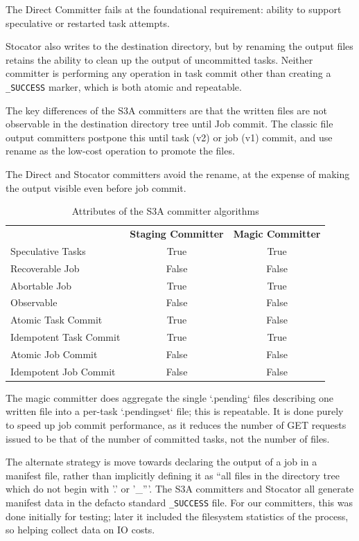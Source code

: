 \documentclass[conference]{IEEEtran}
\begin{document}
The Direct Committer fails at the foundational requirement: ability to support
speculative or restarted task attempts.

Stocator also writes to the destination directory, but by renaming the output
files retains the ability to clean up the output of uncommitted tasks.
Neither committer is performing any operation in task commit other than creating
a \texttt{\_SUCCESS} marker, which is both atomic and repeatable.


The key differences of the S3A committers are that the written files are
not observable in the destination directory tree until Job commit.
The classic file output committers postpone this until task (v2) or job (v1)
commit, and use rename as the low-cost operation to promote the files.


The Direct and Stocator committers avoid the rename, at the expense of making
the output visible even before job commit.

\begin{table}
  \label{tab:s3a-committer-attributes}
  \begin{tabular}{ l c c }
    \hline
    & \textbf{Staging Committer} & \textbf{Magic Committer} \\
    Speculative Tasks & True & True \\
    Recoverable Job & False & False \\
    Abortable Job & True & True \\
    Observable & False & False \\
    Atomic Task Commit & True & False \\
    Idempotent Task Commit & True & True \\
    Atomic Job Commit & False & False \\
    Idempotent Job Commit & False & False \\
    \hline
  \end{tabular}
  \caption{Attributes of the S3A committer algorithms}
\end{table}


The magic committer does aggregate the single `.pending` files describing
one written file into a per-task `.pendingset` file;
this is repeatable.
It is done purely to speed up job commit performance, as it reduces the
number of GET requests issued to be that of the number of committed tasks,
not the number of files.


The alternate strategy is move towards declaring the output of a job in
a manifest file, rather than implicitly defining it as ``all files in the directory
tree which do not begin with '.' or '\_'''.
The S3A committers and Stocator all generate manifest data in the defacto
standard \texttt{\_SUCCESS} file.
For our committers, this was done initially for testing;
later it included the filesystem statistics of the process, so helping
collect data on IO costs.
\end{document}
